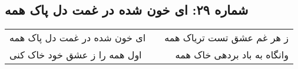 \begin{center}
\section*{شماره ۲۹: ای خون شده در غمت دل پاک همه}
\label{sec:029}
\begin{longtable}{l p{0.5cm} r}
ای خون شده در غمت دل پاک همه
&&
ز هر غم عشق تست تریاک همه
\\
اول همه را ز عشق خود خاک کنی
&&
وانگاه به باد بردهی خاک همه
\\
\end{longtable}
\end{center}
